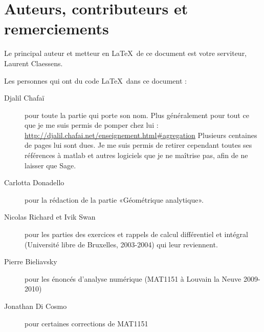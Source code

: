 \section{Auteurs, contributeurs et remerciements}

Le principal auteur et metteur en \LaTeX\ de ce document est votre serviteur, Laurent Claessens.

Les personnes qui ont du code \LaTeX\ dans ce document :
\begin{description}
    \item[Djalil Chafaï] pour toute la partie qui porte son nom. Plus généralement pour tout ce que je me suis permis de pomper chez lui :\\
        \href{http://djalil.chafai.net/enseignement.html#agregation}{http://djalil.chafai.net/enseignement.html#agregation}
        Plusieurs centaines de pages lui sont dues. Je me suis permis de retirer cependant toutes ses références à matlab et autres logiciels que je ne maîtrise pas, afin de ne laisser que Sage.
    \item[Carlotta Donadello] pour la rédaction de la partie «Géométrique analytique». 
    \item[Nicolas Richard et Ivik Swan] pour les parties des exercices et rappels de calcul différentiel et intégral (Université libre de Bruxelles, 2003-2004) qui leur reviennent.
    \item[Pierre Bieliavsky] pour les énoncés d'analyse numérique (MAT1151 à Louvain la Neuve 2009-2010)
    \item[Jonathan Di Cosmo] pour certaines corrections de MAT1151
\end{description}

